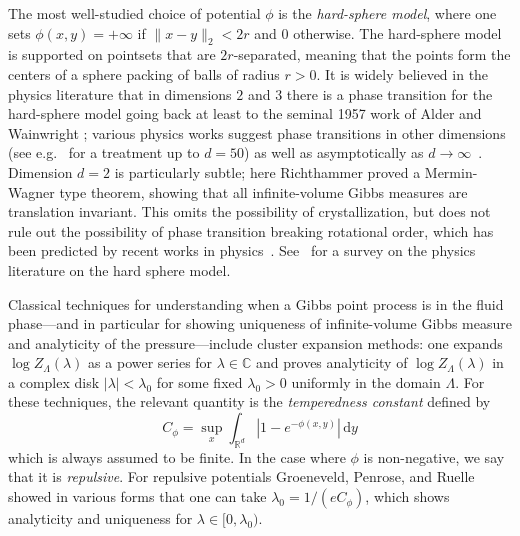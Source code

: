 \documentclass[10pt]{amsart}
\theoremstyle{definition}
\theoremstyle{remark}
\newcommand{\R}{\mathbb{R}}
\newcommand{\C}{\mathbb{C}}
\newcommand{\diff}{\mathrm{d}}
\begin{document}
	
	The most well-studied choice of potential $\phi$ is the \emph{hard-sphere model}, where one sets $\phi(x,y) = + \infty$ if $\|x - y\|_2 < 2r$ and $0$ otherwise.  The hard-sphere model is supported on pointsets that are $2r$-separated, meaning that the points form the centers of a sphere packing of balls of radius $r > 0$. 
	It is widely believed in the physics literature that in dimensions $2$ and $3$ there is a phase transition for the hard-sphere model going back at least to the seminal 1957 work of Alder and Wainwright \cite{alder1957phase}; various physics works suggest phase transitions in other  dimensions (see e.g.\ \cite{finken2001freezing} for a treatment up to $d = 50$) as well as asymptotically as $d \to \infty$~\cite{frisch1999high,parisi2010mean}.  Dimension $d=2$ is particularly subtle; here Richthammer \cite{richthammer2007translation} proved a Mermin-Wagner type theorem, showing that all infinite-volume Gibbs measures are translation invariant.  This omits the possibility of crystallization, but does not rule out the possibility of phase transition breaking rotational order, which has been predicted by recent works in physics~\cite{bernard2011two}. See~\cite{lowen2000fun} for a survey on the physics literature on the hard sphere model. 
	
	
	
	Classical techniques for understanding when a Gibbs point process is in the fluid phase---and in particular for showing uniqueness of infinite-volume Gibbs measure and analyticity of the pressure---include cluster expansion methods: one expands $\log Z_{\Lambda}(\lambda)$ as a power series for $\lambda \in \C$ and proves analyticity of $\log Z_{\Lambda}(\lambda)$ in a complex disk $|\lambda| < \lambda_{0}$ for some fixed $\lambda_{0} > 0$ uniformly in the domain $\Lambda$.  For these techniques, the relevant quantity is the \emph{temperedness constant} defined by \begin{equation}
		C_\phi = \sup_{x} \int_{\R^d}|1 - e^{-\phi(x,y)}| \,\diff y
	\end{equation}
	which is always assumed to be finite. 
	In the case where $\phi$ is non-negative, we say that it is \emph{repulsive}.  For repulsive potentials Groeneveld, Penrose, and Ruelle \cite{groeneveld1962two,penrose1963convergence,ruelle1963correlation} showed in various forms that one can take $\lambda_{0} = 1/(e C_\phi)$, which shows analyticity and uniqueness for $\lambda \in [0,\lambda_0)$. 
	
\end{document}
